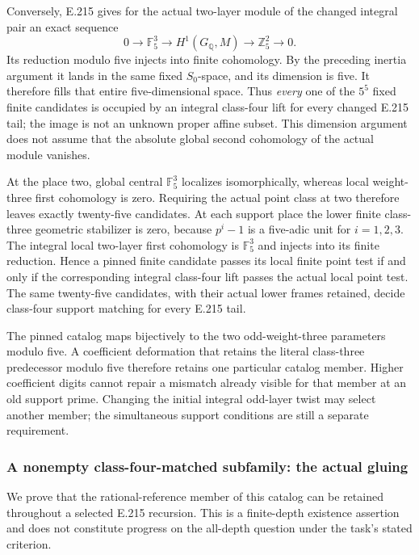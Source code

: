 Conversely, E.215 gives for the actual two-layer module of the changed
integral pair an exact sequence
\[
 0\longrightarrow\mathbb F_5^3\longrightarrow H^1(G_{\mathbb Q},M)
 \longrightarrow\mathbb Z_5^2\longrightarrow0.
\]
Its reduction modulo five injects into finite cohomology. By the preceding
inertia argument it lands in the same fixed $S_0$-space, and its dimension
is five. It therefore fills that entire five-dimensional space. Thus
\emph{every} one of the $5^5$ fixed finite candidates is occupied by an
integral class-four lift for every changed E.215 tail; the image is not an
unknown proper affine subset. This dimension argument does not assume
that the absolute global second cohomology of the actual module vanishes.

At the place two, global central $\mathbb F_5^3$ localizes isomorphically,
whereas local weight-three first cohomology is zero. Requiring the actual
point class at two therefore leaves exactly twenty-five candidates.
At each support place the lower finite class-three geometric stabilizer
is zero, because $p^i-1$ is a five-adic unit for $i=1,2,3$.
The integral local two-layer first cohomology is $\mathbb F_5^3$ and
injects into its finite reduction. Hence a pinned finite candidate passes
its local finite point test if and only if the corresponding integral
class-four lift passes the actual local point test. The same twenty-five
candidates, with their actual lower frames retained, decide class-four
support matching for every E.215 tail.

The pinned catalog maps bijectively to the two odd-weight-three
parameters modulo five. A coefficient deformation that retains the
literal class-three predecessor modulo five therefore retains one
particular catalog member. Higher coefficient digits cannot repair a
mismatch already visible for that member at an old support prime.
Changing the initial integral odd-layer twist may select another member;
the simultaneous support conditions are still a separate requirement.

\subsubsection*{A nonempty class-four-matched subfamily: the actual gluing}
We prove that the rational-reference member of this catalog can be
retained throughout a selected E.215 recursion. This is a finite-depth
existence assertion and does not constitute progress on the all-depth
question under the task's stated criterion.

